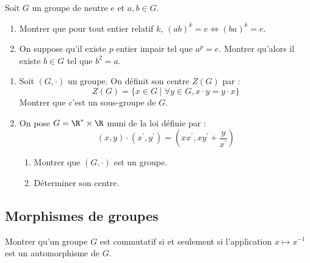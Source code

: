 \begin{exercice}
    Soit $G$ un groupe de neutre $e$ et $a,b\in G$.
    \begin{enumerate}
        \item Montrer que pour tout entier relatif $k$, $(ab)^{k}=e\iff(ba)^{k}=e$.
        \item On suppose qu'il existe $p$ entier impair tel que $a^{p}=e$. Montrer qu'alors il existe $b\in G$ tel que $b^{2}=a$.
    \end{enumerate}
\end{exercice}

\begin{exercice}
\begin{enumerate}
    \item Soit $(G,\cdot)$ un groupe. On définit son centre $Z(G)$ par :
        \[Z(G)=\{x\in G \mid \forall y\in G, x \cdot y=y \cdot x\}\]
        Montrer que c'est un sous-groupe de $G$.
    \item On pose $G=\R^{*}\times\R$ muni de la loi définie par :
        \[(x,y) \cdot (x^{\prime},y^{\prime})=\left(xx^{\prime},xy^{\prime}+\frac{y}{x^{\prime}}\right)\]
        \begin{enumerate}
            \item Montrer que $(G,\cdot)$ est un groupe.
            \item Déterminer son centre.
        \end{enumerate}
\end{enumerate}
\end{exercice}

\subsection{Morphismes de groupes}

\begin{exercice}
    Montrer qu'un groupe $G$ est commutatif si et seulement si l'application $x\mapsto x^{-1}$ est un automorphisme de $G$.
\end{exercice}

